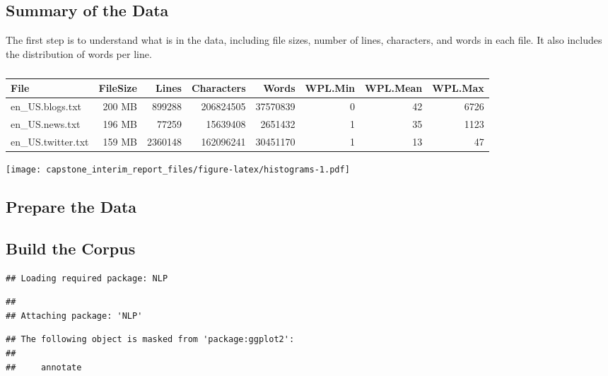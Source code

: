 \documentclass[
]{article}
\begin{document}
\hypertarget{summary-of-the-data}{%
\subsection{Summary of the Data}\label{summary-of-the-data}}

The first step is to understand what is in the data, including file
sizes, number of lines, characters, and words in each file. It also
includes the distribution of words per line.

\begin{table}

\caption{\label{tab:summary}}
\begin{tabular}[t]{l|r|r|r|r|r|r|r}
\hline
File & FileSize & Lines & Characters & Words & WPL.Min & WPL.Mean & WPL.Max\\
\hline
en\_US.blogs.txt & 200  MB & 899288 & 206824505 & 37570839 & 0 & 42 & 6726\\
\hline
en\_US.news.txt & 196  MB & 77259 & 15639408 & 2651432 & 1 & 35 & 1123\\
\hline
en\_US.twitter.txt & 159  MB & 2360148 & 162096241 & 30451170 & 1 & 13 & 47\\
\hline
\end{tabular}
\end{table}

\texttt{[image: capstone\_interim\_report\_files/figure-latex/histograms-1.pdf]}

\hypertarget{prepare-the-data}{%
\subsection{Prepare the Data}\label{prepare-the-data}}

\hypertarget{build-the-corpus}{%
\subsection{Build the Corpus}\label{build-the-corpus}}

\begin{verbatim}
## Loading required package: NLP
\end{verbatim}

\begin{verbatim}
## 
## Attaching package: 'NLP'
\end{verbatim}

\begin{verbatim}
## The following object is masked from 'package:ggplot2':
## 
##     annotate
\end{verbatim}
\end{document}
